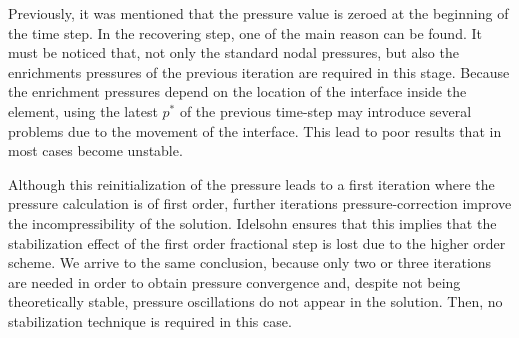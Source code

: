 Previously, it was mentioned that the pressure value is zeroed at the beginning of the time step. In the recovering step, one of the main reason can be found. It must be noticed that, not only the standard nodal pressures, but also the enrichments pressures of the previous iteration are required in this stage. Because the enrichment pressures depend on the location of the interface inside the element, using the latest $p^*$ of the previous time-step may introduce several problems due to the movement of the interface. This lead to poor results that in most cases become unstable.

Although this reinitialization of the pressure leads to a first iteration where the pressure calculation is of first order, further iterations pressure-correction improve the incompressibility of the solution. Idelsohn\cite{Idelsohn13c} ensures that this implies that the stabilization effect of the first order fractional step is lost due to the higher order scheme. We arrive to the same conclusion, because only two or three iterations are needed in order to obtain pressure convergence and, despite not being theoretically stable, pressure oscillations do not appear in the solution. Then, no stabilization technique is required in this case.